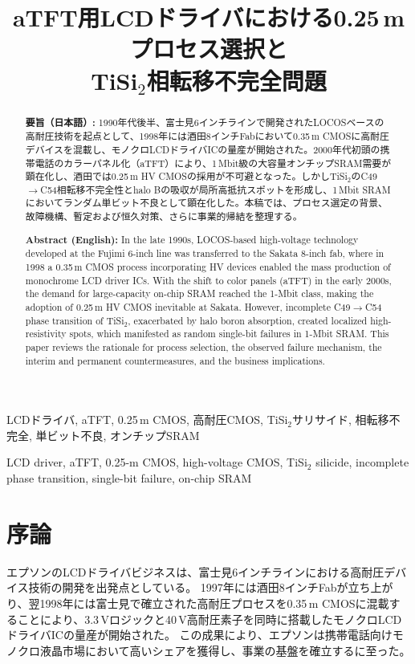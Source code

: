 \documentclass[conference]{IEEEtran}
\title{aTFT用LCDドライバにおける0.25\,\textmu mプロセス選択と\\
TiSi\texorpdfstring{$_2$}{2}相転移不完全問題}
\author{%
  \IEEEauthorblockN{三溝 真一 (Shinichi Samizo)}%
  \IEEEauthorblockA{独立系半導体研究者（元セイコーエプソン）\\%
  Independent Semiconductor Researcher (ex-Seiko Epson)\\%
  Email: \href{mailto:shin3t72@gmail.com}{shin3t72@gmail.com}\\%
  GitHub: \url{https://github.com/Samizo-AITL}}%
}
\begin{document}
\maketitle

\begin{abstract}
\noindent\textbf{要旨（日本語）:}  
1990年代後半、富士見6インチラインで開発されたLOCOSベースの高耐圧技術を起点として、1998年には酒田8インチFabにおいて0.35\,\textmu m CMOSに高耐圧デバイスを混載し、モノクロLCDドライバICの量産が開始された。2000年代初頭の携帯電話のカラーパネル化（aTFT）により、1\,Mbit級の大容量オンチップSRAM需要が顕在化し、酒田では0.25\,\textmu m HV CMOSの採用が不可避となった。しかしTiSi$_2$のC49$\to$C54相転移不完全性とhalo Bの吸収が局所高抵抗スポットを形成し、1\,Mbit SRAMにおいてランダム単ビット不良として顕在化した。本稿では、プロセス選定の背景、故障機構、暫定および恒久対策、さらに事業的帰結を整理する。  

\vspace{1ex}
\noindent\textbf{Abstract (English):}  
In the late 1990s, LOCOS-based high-voltage technology developed at the Fujimi 6-inch line was transferred to the Sakata 8-inch fab, where in 1998 a 0.35\,\textmu m CMOS process incorporating HV devices enabled the mass production of monochrome LCD driver ICs. With the shift to color panels (aTFT) in the early 2000s, the demand for large-capacity on-chip SRAM reached the 1-Mbit class, making the adoption of 0.25\,\textmu m HV CMOS inevitable at Sakata. However, incomplete C49$\to$C54 phase transition of TiSi$_2$, exacerbated by halo boron absorption, created localized high-resistivity spots, which manifested as random single-bit failures in 1-Mbit SRAM. This paper reviews the rationale for process selection, the observed failure mechanism, the interim and permanent countermeasures, and the business implications.
\end{abstract}

\begin{IEEEkeywords}
LCDドライバ, aTFT, 0.25\,\textmu m CMOS, 高耐圧CMOS, TiSi$_2$サリサイド, 相転移不完全, 単ビット不良, オンチップSRAM
\end{IEEEkeywords}

\begin{IEEEkeywords}
LCD driver, aTFT, 0.25-\textmu m CMOS, high-voltage CMOS, TiSi$_2$ silicide, incomplete phase transition, single-bit failure, on-chip SRAM
\end{IEEEkeywords}

\section{序論}
エプソンのLCDドライバビジネスは、富士見6インチラインにおける高耐圧デバイス技術の開発を出発点としている。  
1997年には酒田8インチFabが立ち上がり、翌1998年には富士見で確立された高耐圧プロセスを0.35\,\textmu m CMOSに混載することにより、3.3\,Vロジックと40\,V高耐圧素子を同時に搭載したモノクロLCDドライバICの量産が開始された。  
この成果により、エプソンは携帯電話向けモノクロ液晶市場において高いシェアを獲得し、事業の基盤を確立するに至った。  
\end{document}
